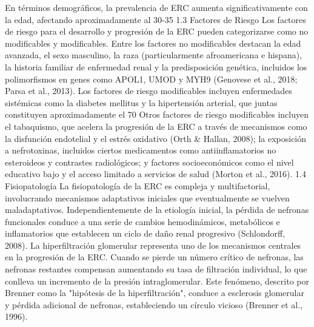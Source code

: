 \documentclass{article}
\begin{document}
\begin{multicols}{2}
En términos demográficos, la prevalencia de ERC aumenta significativamente con la edad, afectando aproximadamente al 30-35%
 1.3 Factores de Riesgo
Los factores de riesgo para el desarrollo y progresión de la ERC pueden categorizarse como no modificables y modificables. Entre los factores no modificables destacan la edad avanzada, el sexo masculino, la raza (particularmente afroamericana e hispana), la historia familiar de enfermedad renal y la predisposición genética, incluidos los polimorfismos en genes como APOL1, UMOD y MYH9 (Genovese et al., 2018; Parsa et al., 2013).
Los factores de riesgo modificables incluyen enfermedades sistémicas como la diabetes mellitus y la hipertensión arterial, que juntas constituyen aproximadamente el 70%
Otros factores de riesgo modificables incluyen el tabaquismo, que acelera la progresión de la ERC a través de mecanismos como la disfunción endotelial y el estrés oxidativo (Orth \& Hallan, 2008); la exposición a nefrotoxinas, incluidos ciertos medicamentos como antiinflamatorios no esteroideos y contrastes radiológicos; y factores socioeconómicos como el nivel educativo bajo y el acceso limitado a servicios de salud (Morton et al., 2016).
 1.4 Fisiopatología
La fisiopatología de la ERC es compleja y multifactorial, involucrando mecanismos adaptativos iniciales que eventualmente se vuelven maladaptativos. Independientemente de la etiología inicial, la pérdida de nefronas funcionales conduce a una serie de cambios hemodinámicos, metabólicos e inflamatorios que establecen un ciclo de daño renal progresivo (Schlondorff, 2008).
La hiperfiltración glomerular representa uno de los mecanismos centrales en la progresión de la ERC. Cuando se pierde un número crítico de nefronas, las nefronas restantes compensan aumentando su tasa de filtración individual, lo que conlleva un incremento de la presión intraglomerular. Este fenómeno, descrito por Brenner como la "hipótesis de la hiperfiltración", conduce a esclerosis glomerular y pérdida adicional de nefronas, estableciendo un círculo vicioso (Brenner et al., 1996).

\end{multicols}
\end{document}
